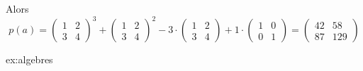 {\begin{enumerate}
		Alors
			\[ p(a) = \begin{pmatrix} 1 & 2 \\ 3 & 4 \end{pmatrix}^3 + \begin{pmatrix} 1 & 2 \\ 3 & 4 \end{pmatrix}^2 - 3\cdot\begin{pmatrix} 1 & 2 \\ 3 & 4 \end{pmatrix} + 1\cdot\begin{pmatrix} 1 & 0 \\ 0 & 1 \end{pmatrix} = \begin{pmatrix} 42 & 58 \\ 87 & 129 \end{pmatrix} \]
	\end{enumerate}
}{ex:algebres}

